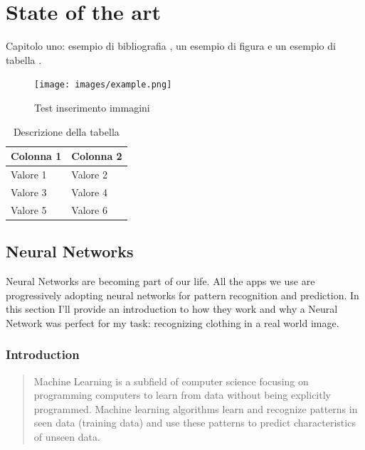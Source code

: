 \chapter{State of the art}
\label{stato dell'arte}


Capitolo uno: 
esempio di bibliografia \cite{2015arXiv150200046K}, un esempio di figura  e un esempio di tabella .

\begin{figure}[H]
	\centering
	\texttt{[image: images/example.png]}
	\caption{Test inserimento immagini}
	\label{figure:test inserimento}
\end{figure}

\begin{table}[!htbp]
	\centering
	\begin{tabular}{l|l}
		\toprule
		Colonna 1 & Colonna 2 \\
		\midrule
		Valore 1 & Valore 2 \\
		Valore 3 & Valore 4 \\
		Valore 5 & Valore 6 \\
		\bottomrule
	\end{tabular}
	\caption{Descrizione della tabella}
	\label{table:esempio_tabella}
\end{table}


\section{Neural Networks}\label{s:fundamentals}

Neural Networks are becoming part of our life. All the apps we use are progressively adopting neural networks for pattern recognition and prediction.
In this section I'll provide an introduction to how they work and why a Neural Network was perfect for my task: recognizing clothing in a real world image.

\subsection{Introduction}\label{s:fund-intro}
\begin{quotation}
Machine Learning is a subfield of computer science focusing on programming computers to learn from data without being explicitly programmed. Machine learning algorithms learn and recognize patterns in seen data (training data) and use these patterns to predict characteristics of unseen data. \cite{IntroductiontoMachineLearningAlanZhengSeptember2018}
\end{quotation}

